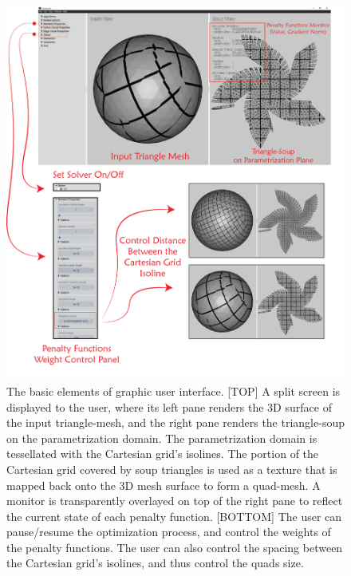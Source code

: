 \begin{figure}[ht]
\centering
\includegraphics[width=15cm]{figures/gui.png}
\caption[Graphic User Interface]{The basic elements of graphic user interface. [TOP] A split screen is displayed to the user, where its left pane renders the 3D surface of the input triangle-mesh, and the right pane renders the triangle-soup on the parametrization domain. The parametrization domain is tessellated with the Cartesian grid's isolines. The portion of the Cartesian grid covered by soup triangles is used as a texture that is mapped back onto the 3D mesh surface to form a quad-mesh. A monitor is transparently overlayed on top of the right pane to reflect the current state of each penalty function.  [BOTTOM] The user can pause/resume the optimization process, and control the weights of the penalty functions. The user can also control the spacing between the Cartesian grid's isolines, and thus control the quads size.}
\label{fig:gui}
\end{figure}